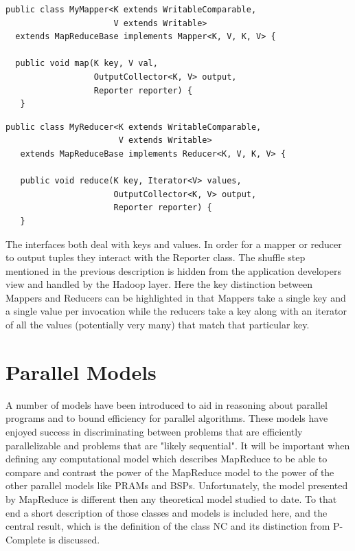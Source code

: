 \documentclass{article}
\begin{document}
\begin{lstlisting}[label=some-code,caption=Mapper Interface]
public class MyMapper<K extends WritableComparable,
                      V extends Writable> 
  extends MapReduceBase implements Mapper<K, V, K, V> {
       
  public void map(K key, V val,
                  OutputCollector<K, V> output, 
                  Reporter reporter) { 
   }
\end{lstlisting}

\begin{lstlisting}[label=some-code,caption=Reducer Interface]
public class MyReducer<K extends WritableComparable,
                       V extends Writable> 
   extends MapReduceBase implements Reducer<K, V, K, V> {
       
   public void reduce(K key, Iterator<V> values,
                      OutputCollector<K, V> output, 
                      Reporter reporter) {
   }
\end{lstlisting}

The interfaces both deal with keys and values. In order for a mapper or reducer to output tuples they interact with the Reporter class. The shuffle step mentioned in the previous description is hidden from the application developers view and handled by the Hadoop layer. Here the key distinction between Mappers and Reducers can be highlighted in that Mappers take a single key and a single value per invocation while the reducers take a key along with an iterator of all the values (potentially very many) that match that particular key. 

\section{Parallel Models}
A number of models have been introduced to aid in reasoning about parallel programs and to bound efficiency for parallel algorithms. These models have enjoyed success in discriminating between problems that are efficiently parallelizable and problems that are "likely sequential". It will be important when defining any computational model which describes MapReduce to be able to compare and contrast the power of the MapReduce model to the power of the other parallel models like PRAMs and BSPs. Unfortunately, the model presented by MapReduce is different then any theoretical model studied to date. To that end a short description of those classes and models is included here, and the central result, which is the definition of the class NC and its distinction from P-Complete is discussed. 
 
\end{document}

